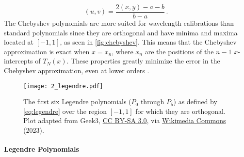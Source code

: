\begin{equation} \label{eq:XtoUV}
    (u, v) = \frac{2 (x, y) - a - b}{b - a}\,.
\end{equation}
The Chebyshev polynomials are more suited for wavelength calibrations than standard polynomials since they are orthogonal and have minima and maxima located at $[-1, 1]$, as seen in \autoref{fig:chebyshev}.
This means that the Chebyshev approximation is exact when $x = x_{n}$, where $x_{n}$ are the positions of the $n - 1$ $x$-intercepts of $T_{N}(x)$.
These properties greatly minimize the error in the Chebyshev approximation, even at lower orders \citep{cheby}.



\begin{figure}[t]
    \centering
    \texttt{[image: 2\_legendre.pdf]}
    \caption{
        The first six Legendre polynomials ($P_0$ through $P_{5}$) as defined by \autoref{eq:legendre} over the region $[-1, 1]$ for which they are orthogonal.
        Plot adapted from Geek3, \protect\href{https://creativecommons.org/licenses/by-sa/3.0}{CC BY-SA 3.0}, via \protect\href{https://commons.wikimedia.org/wiki/File:Legendrepolynomials6.svg}{Wikimedia Commons} (2023).
    }
    \label{fig:legendre}
\end{figure}

\paragraph{Legendre Polynomials}

